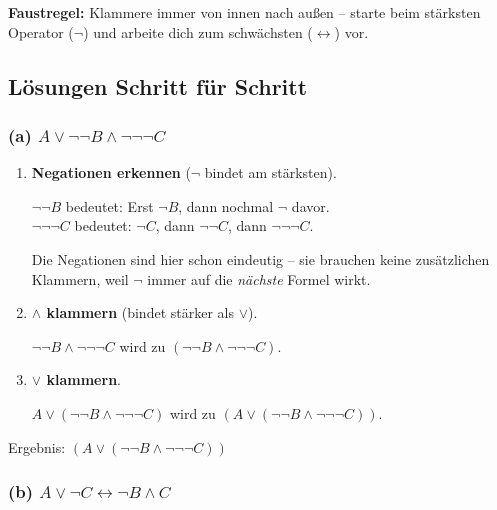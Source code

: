 \documentclass[a4paper,12pt]{article}
\begin{document}
\begin{merkbox}
\textbf{Faustregel:} Klammere immer von innen nach au\ss en --
starte beim st\"arksten Operator ($\neg$) und arbeite dich zum
schw\"achsten ($\leftrightarrow$) vor.
\end{merkbox}

\subsection{L\"osungen Schritt f\"ur Schritt}

\subsubsection*{(a) $A \vee \neg\neg B \wedge \neg\neg\neg C$}

\begin{enumerate}[leftmargin=2cm]
\item[\textbf{Schritt 1:}] \textbf{Negationen erkennen} ($\neg$ bindet am st\"arksten).

$\neg\neg B$ bedeutet: Erst $\neg B$, dann nochmal $\neg$ davor.\\
$\neg\neg\neg C$ bedeutet: $\neg C$, dann $\neg\neg C$, dann $\neg\neg\neg C$.

Die Negationen sind hier schon eindeutig -- sie brauchen keine
zus\"atzlichen Klammern, weil $\neg$ immer auf die \emph{n\"achste}
Formel wirkt.

\item[\textbf{Schritt 2:}] \textbf{$\wedge$ klammern} (bindet st\"arker als $\vee$).

$\neg\neg B \wedge \neg\neg\neg C$ wird zu
$(\neg\neg B \wedge \neg\neg\neg C)$.

\item[\textbf{Schritt 3:}] \textbf{$\vee$ klammern}.

$A \vee (\neg\neg B \wedge \neg\neg\neg C)$ wird zu
$(A \vee (\neg\neg B \wedge \neg\neg\neg C))$.
\end{enumerate}

\begin{merkbox}
Ergebnis: $\boxed{(A \vee (\neg\neg B \wedge \neg\neg\neg C))}$
\end{merkbox}

\subsubsection*{(b) $A \vee \neg C \leftrightarrow \neg B \wedge C$}
\end{document}
